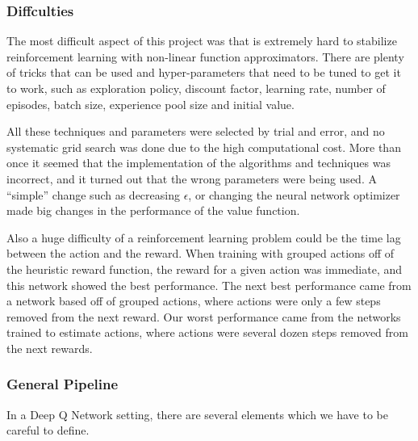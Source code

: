 \documentclass[a4paper]{article}
\begin{document}
\subsubsection{Diffculties}

The most difficult aspect of this project was that is extremely hard to stabilize reinforcement learning with non-linear function approximators. There are plenty of tricks that can be used and hyper-parameters that need to be tuned to get it to work, such as exploration policy, discount factor, learning rate, number of episodes, batch size, experience pool size and initial value.

All these techniques and parameters were selected by trial and error, and no systematic grid search was done due to the high computational cost. More than once it seemed that the implementation of the algorithms and techniques was incorrect, and it turned out that the wrong parameters were being used. A ``simple'' change such as decreasing $\epsilon$, or changing the neural network optimizer made big changes in the performance of the value function.

Also a huge difficulty of a reinforcement learning problem could be the time lag between the action and the reward. When training with grouped actions off of the heuristic reward function, the reward for a given action was immediate, and this network showed the best performance. The next best performance came from a network based off of grouped actions, where actions were only a few steps removed from the next reward. Our worst performance came from the networks trained to estimate actions, where actions were several dozen steps removed from the next rewards.

\subsubsection{General Pipeline}

In a Deep Q Network setting, there are several elements which we have to be careful to define.
\end{document}
